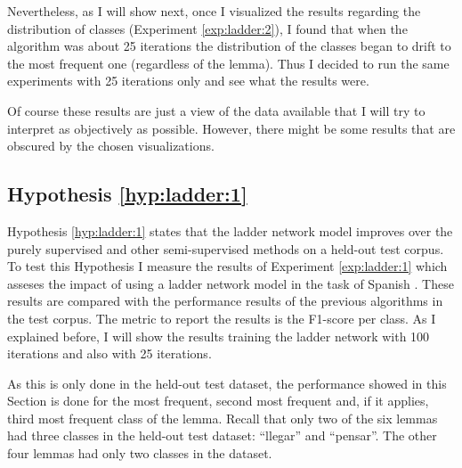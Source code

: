 Nevertheless, as I will show next, once I visualized the results regarding the
distribution of classes (Experiment \ref{exp:ladder:2}), I found that when the
algorithm was about 25 iterations the distribution of the classes began to
drift to the most frequent one (regardless of the lemma). Thus I decided to run
the same experiments with 25 iterations only and see what the results were. 

Of course these results are just a view of the data available that I will try
to interpret as objectively as possible. However, there might be some results
that are obscured by the chosen visualizations.

\subsection{Hypothesis \ref{hyp:ladder:1}}\label{sec:ladder:hyp:1}

Hypothesis \ref{hyp:ladder:1} states that the ladder network model improves
over the purely supervised and other semi-supervised methods on a held-out test
corpus. To test this Hypothesis I measure the results of Experiment
\ref{exp:ladder:1} which asseses the impact of using a ladder network model in
the task of Spanish \vsd. These results are compared with the performance
results of the previous algorithms in the test corpus. The metric to report the
results is the F1-score per class. As I explained before, I will show the
results training the ladder network with 100 iterations and also with 25
iterations.

As this is only done in the held-out test dataset, the performance showed in
this Section is done for the most frequent, second most frequent and, if it
applies, third most frequent class of the lemma. Recall that only two of the
six lemmas had three classes in the held-out test dataset: ``llegar'' and
``pensar''. The other four lemmas had only two classes in the dataset.

